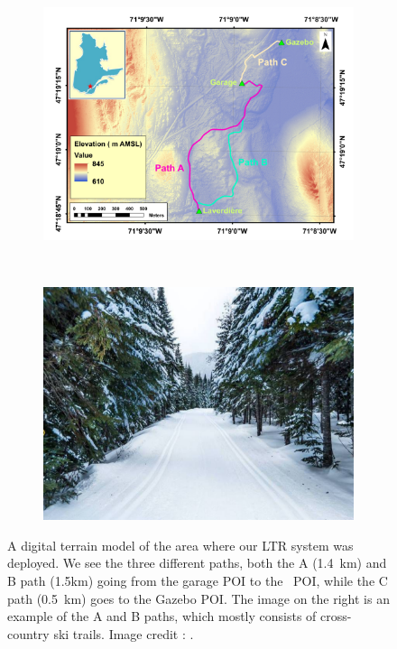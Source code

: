 \begin{figure}[htpb]
	\begin{center}
		\begin{subfigure}[b]{0.49\textwidth}
			\includegraphics[width=\linewidth]{figs/map-dem.pdf}
			\label{fig:view_above}
		\end{subfigure}%
		~~
		\begin{subfigure}[b]{0.49\textwidth}
			\includegraphics[width=\linewidth]{figs/foret-montmorency-path.pdf}
			\label{fig:view_path}
		\end{subfigure}%
		\caption{A digital terrain model of the area where our \ac{LTR} system was deployed.
		We see the three different paths, both the A (\SI{1.4}{km}) and B path ({1.5}{km}) going from the garage \ac{POI} to the \laverdiere~\ac{POI}, while the C path (\SI{0.5}{km}) goes to the Gazebo \ac{POI}.
		The image on the right is an example of the A and B paths, which mostly consists of cross-country ski trails.
		Image credit : \foretmo.} 
		\label{fig:forest}
	\end{center}
\end{figure}

